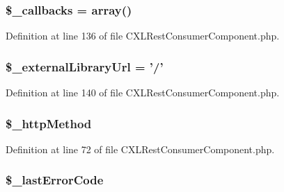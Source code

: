 \hypertarget{classCXLRestConsumerComponent_ae1d5e7a4a34ac8fa4dbdef28983a1fcc}{
\subsubsection[{\$\_\-callbacks}]{\setlength{\rightskip}{0pt plus 5cm}\$\_\-callbacks = array()}}
\label{classCXLRestConsumerComponent_ae1d5e7a4a34ac8fa4dbdef28983a1fcc}


Definition at line 136 of file CXLRestConsumerComponent.php.

\hypertarget{classCXLRestConsumerComponent_aae8a45534cedd7fc0881ca1995d8bb9c}{
\subsubsection[{\$\_\-externalLibraryUrl}]{\setlength{\rightskip}{0pt plus 5cm}\$\_\-externalLibraryUrl = '/'}}
\label{classCXLRestConsumerComponent_aae8a45534cedd7fc0881ca1995d8bb9c}


Definition at line 140 of file CXLRestConsumerComponent.php.

\hypertarget{classCXLRestConsumerComponent_a1fa7e8f053c645c627f16bcf41f2416a}{
\subsubsection[{\$\_\-httpMethod}]{\setlength{\rightskip}{0pt plus 5cm}\$\_\-httpMethod}}
\label{classCXLRestConsumerComponent_a1fa7e8f053c645c627f16bcf41f2416a}


Definition at line 72 of file CXLRestConsumerComponent.php.

\hypertarget{classCXLRestConsumerComponent_a9d205559114adfd52ac69bbb094a8a1a}{
\subsubsection[{\$\_\-lastErrorCode}]{\setlength{\rightskip}{0pt plus 5cm}\$\_\-lastErrorCode}}
\label{classCXLRestConsumerComponent_a9d205559114adfd52ac69bbb094a8a1a}


